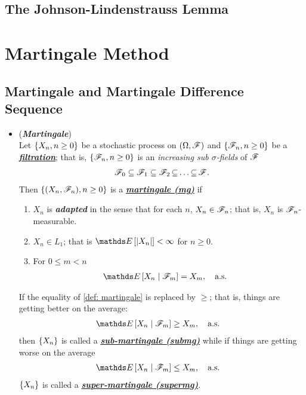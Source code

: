 \documentclass[11pt]{article}
\begin{document}
\subsection{The Johnson-Lindenstrauss Lemma}


\section{Martingale Method}
\subsection{Martingale and Martingale Difference Sequence}
\begin{itemize}
\item \begin{definition} (\emph{\textbf{Martingale}}) \citep{resnick2013probability}\\
Let $\left\{X_n, n \ge 0\right\}$ be a stochastic process on $(\Omega, {\mathscr F})$ and $\left\{{\mathscr F}_n, n \ge 0\right\}$ be a \underline{\textbf{\emph{filtration}}}; that is, $\left\{{\mathscr F}_n, n \ge 0\right\}$ is an \emph{increasing sub $\sigma$-fields} of ${\mathscr F}$
\begin{align*}
{\mathscr F}_0 \subseteq {\mathscr F}_1 \subseteq {\mathscr F}_2 \,{\subseteq}\ldots{\subseteq}\, {\mathscr F}.
\end{align*} Then $\left\{ (X_n, {\mathscr F}_n),  n \ge 0\right\}$ is a \underline{\emph{\textbf{martingale (mg)}}} if
\begin{enumerate}
\item  $X_n$ is \emph{\textbf{adapted}} in the sense that for each $n$, $X_n \in {\mathscr F}_n$; that is, $X_n$ is ${\mathscr F}_n$-measurable.
\item  $X_n \in L_1$; that is $\E{}{\abs{X_n}} < \infty$ for $n \ge 0$.
\item For $0 \le m < n$
\begin{align}
\E{}{X_n \;|\; \srF_m} &= X_m, \quad \text{a.s.} \label{def: martingale}
\end{align}
\end{enumerate}
If the equality of \eqref{def: martingale} is replaced by $\ge$; that is, things are getting better on the average:
\begin{align}
\E{}{X_n \;|\; \srF_m} &\ge X_m, \quad \text{a.s.} \label{def: sub_martingale}
\end{align} then $\left\{X_n\right\}$ is called a \underline{\emph{\textbf{sub-martingale (submg)}}} while if things are getting worse on
the average
\begin{align}
\E{}{X_n \;|\; \srF_m} &\le X_m, \quad \text{a.s.} \label{def: sup_martingale}
\end{align}  $\left\{X_n\right\}$ is called a \underline{\emph{\textbf{super-martingale (supermg)}}}.
\end{definition}


\end{itemize}
\end{document}
